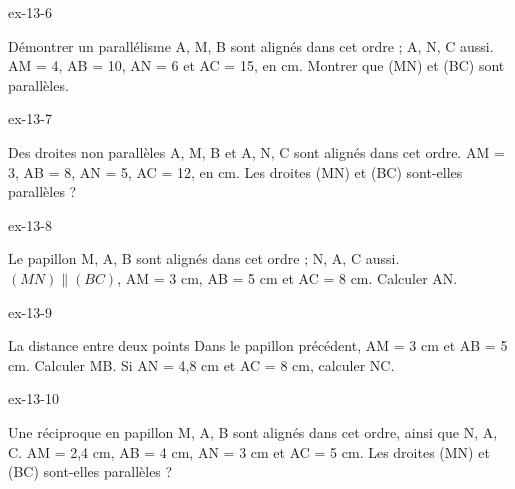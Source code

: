 \clearpage{}
\begin{blocLivre}{ex-13-6}\begin{exercice}[2]{Démontrer un parallélisme}
A, M, B sont alignés dans cet ordre ; A, N, C aussi. AM = 4, AB = 10, AN = 6 et AC = 15, en cm. Montrer que (MN) et (BC) sont parallèles.
\label{fig-ex-13-6}
\end{exercice}\end{blocLivre}
\begin{blocLivre}{ex-13-7}\begin{exercice}[2]{Des droites non parallèles}
A, M, B et A, N, C sont alignés dans cet ordre. AM = 3, AB = 8, AN = 5, AC = 12, en cm. Les droites (MN) et (BC) sont-elles parallèles ?
\label{fig-ex-13-7}
\end{exercice}\end{blocLivre}
\begin{blocLivre}{ex-13-8}\begin{exercice}[2]{Le papillon}
M, A, B sont alignés dans cet ordre ; N, A, C aussi. $(MN)\parallel(BC)$, AM = 3 cm, AB = 5 cm et AC = 8 cm. Calculer AN.
\label{fig-ex-13-8}
\end{exercice}\end{blocLivre}
\begin{blocLivre}{ex-13-9}\begin{exercice}[2]{La distance entre deux points}
Dans le papillon précédent, AM = 3 cm et AB = 5 cm. Calculer MB. Si AN = 4,8 cm et AC = 8 cm, calculer NC.
\label{fig-ex-13-9}
\end{exercice}\end{blocLivre}
\begin{blocLivre}{ex-13-10}\begin{exercice}[2]{Une réciproque en papillon}
M, A, B sont alignés dans cet ordre, ainsi que N, A, C. AM = 2,4 cm, AB = 4 cm, AN = 3 cm et AC = 5 cm. Les droites (MN) et (BC) sont-elles parallèles ?
\label{fig-ex-13-10}
\end{exercice}\end{blocLivre}

